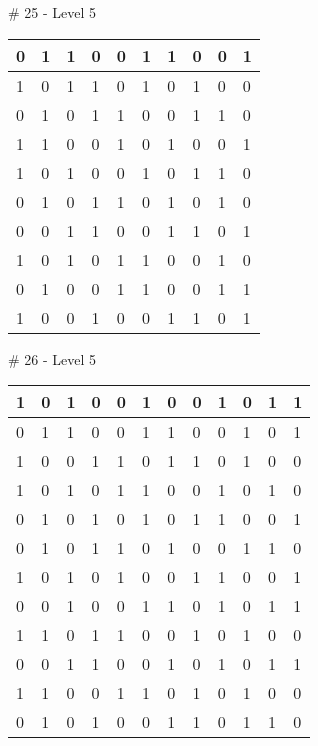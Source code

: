 \smallskip

\# 25 - Level 5 \newline
\begin{tabular}{|m{\collen}|m{\collen}|m{\collen}|m{\collen}|m{\collen}|m{\collen}|m{\collen}|m{\collen}|m{\collen}|m{\collen}|}
\hline
  0 & 1 & 1 & 0 & 0 & 1 & 1 & 0 & 0 & 1 \\
\hline
  1 & 0 & 1 & 1 & 0 & 1 & 0 & 1 & 0 & 0 \\
\hline
  0 & 1 & 0 & 1 & 1 & 0 & 0 & 1 & 1 & 0 \\
\hline
  1 & 1 & 0 & 0 & 1 & 0 & 1 & 0 & 0 & 1 \\
\hline
  1 & 0 & 1 & 0 & 0 & 1 & 0 & 1 & 1 & 0 \\
\hline
  0 & 1 & 0 & 1 & 1 & 0 & 1 & 0 & 1 & 0 \\
\hline
  0 & 0 & 1 & 1 & 0 & 0 & 1 & 1 & 0 & 1 \\
\hline
  1 & 0 & 1 & 0 & 1 & 1 & 0 & 0 & 1 & 0 \\
\hline
  0 & 1 & 0 & 0 & 1 & 1 & 0 & 0 & 1 & 1 \\
\hline
  1 & 0 & 0 & 1 & 0 & 0 & 1 & 1 & 0 & 1 \\
\hline
\end{tabular}


\smallskip

\# 26 - Level 5 \newline
\begin{tabular}{|m{\collen}|m{\collen}|m{\collen}|m{\collen}|m{\collen}|m{\collen}|m{\collen}|m{\collen}|m{\collen}|m{\collen}|m{\collen}|m{\collen}|}
\hline
  1 & 0 & 1 & 0 & 0 & 1 & 0 & 0 & 1 & 0 & 1 & 1 \\
\hline
  0 & 1 & 1 & 0 & 0 & 1 & 1 & 0 & 0 & 1 & 0 & 1 \\
\hline
  1 & 0 & 0 & 1 & 1 & 0 & 1 & 1 & 0 & 1 & 0 & 0 \\
\hline
  1 & 0 & 1 & 0 & 1 & 1 & 0 & 0 & 1 & 0 & 1 & 0 \\
\hline
  0 & 1 & 0 & 1 & 0 & 1 & 0 & 1 & 1 & 0 & 0 & 1 \\
\hline
  0 & 1 & 0 & 1 & 1 & 0 & 1 & 0 & 0 & 1 & 1 & 0 \\
\hline
  1 & 0 & 1 & 0 & 1 & 0 & 0 & 1 & 1 & 0 & 0 & 1 \\
\hline
  0 & 0 & 1 & 0 & 0 & 1 & 1 & 0 & 1 & 0 & 1 & 1 \\
\hline
  1 & 1 & 0 & 1 & 1 & 0 & 0 & 1 & 0 & 1 & 0 & 0 \\
\hline
  0 & 0 & 1 & 1 & 0 & 0 & 1 & 0 & 1 & 0 & 1 & 1 \\
\hline
  1 & 1 & 0 & 0 & 1 & 1 & 0 & 1 & 0 & 1 & 0 & 0 \\
\hline
  0 & 1 & 0 & 1 & 0 & 0 & 1 & 1 & 0 & 1 & 1 & 0 \\
\hline
\end{tabular}


